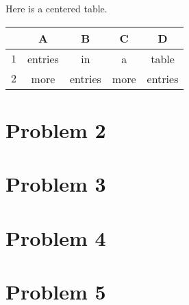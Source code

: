 \documentclass[twoside,11pt]{homework}
\begin{document}
Here is a centered table.
\begin{center}
  \begin{tabular}{c||c|c|c|c}
    & A
    & B
    & C
    & D \\
    \hline
    \hline
    $1$
    & entries
    & in
    & a
    & table
    \\
    \hline
    $2$
    & more
    & entries
    & more
    & entries
  \end{tabular}
\end{center}


\section*{Problem 2}


\section*{Problem 3}


\section*{Problem 4}


\section*{Problem 5}

\end{document}
